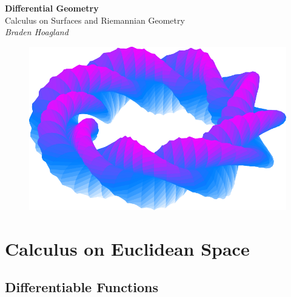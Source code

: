 \documentclass[10pt]{report}
\begin{document}
\begin{titlepage}
        \begin{center}
                {\Huge\textbf{Differential Geometry}}\\
                \vspace{4mm}
                Calculus on Surfaces and Riemannian Geometry\\
                \vspace{6mm}
                \textit{Braden Hoagland}
        \end{center}
        \begin{figure}[H]
                \centering
                \includegraphics[scale=0.9]{fig/curvy-donut.pdf}
        \end{figure}

\end{titlepage}

\tableofcontents


\chapter{Calculus on Euclidean Space}


\section{Differentiable Functions}
\end{document}
